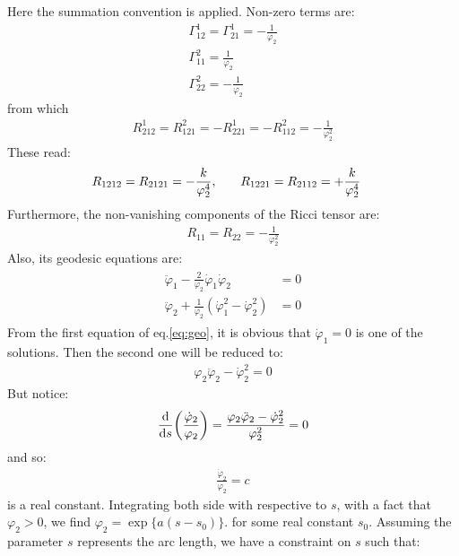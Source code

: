 Here the summation convention is applied. Non-zero terms are:
\begin{align}
    \label{eq:2.53}
    \Gamma _{12} ^{1} = \Gamma _{21}^{1} = -\frac{1}{\varphi _{2}} \\
    \label{eq:2.54}
    \Gamma _{11} ^{2} = \frac{1}{\varphi _{2}}\\
    \label{eq:2.55}
    \Gamma _{22}^{2} = -\frac{1}{\varphi _{2}}
\end{align}
from which
\begin{align}
    R_{212}^{1} = R_{121}^{2} = -R_{221}^{1} = -R_{112}^{2} = -\frac{1}{\varphi_{2} ^{2}}
\end{align}
These read:
\begin{align}
    R_{1212} = R_{2121} = -\frac{k}{\varphi_{2} ^{4}} ,& \qq{} R_{1221} = R_{2112} = +\frac{k}{\varphi_{2} ^{4}}
\end{align}
Furthermore, the non-vanishing components of the Ricci tensor are:
\begin{align}
    R_{11} = R_{22} = -\frac{1}{\varphi_{2}^{2}}
\end{align}
Also, its geodesic equations are:
\begin{align}[left=\empheqlbrace]
    \label{eq:geo}
    \begin{split}
        \ddot \varphi_{1} - \frac{2}{\varphi_{2}} \dot \varphi_{1} \dot \varphi_{2} &= 0 \\
        \ddot \varphi_{2} +\frac{1}{\varphi_{2}} (\dot \varphi_{1} ^{2} - \dot \varphi_{2}^{2}) &=0
    \end{split}
\end{align}
From the first equation of eq.\ref{eq:geo}, it is obvious that $\dot \varphi _{1} = 0$ is one of the solutions. Then the second one will be reduced to:
\begin{align}
    \varphi _{2} \ddot{\varphi}_{2} - \dot \varphi _{2} ^{2} = 0
\end{align}
But notice:
\begin{align}
    \dv{s}(\frac{\dot \varphi_{2}}{\varphi_{2}}) = \frac{\varphi _{2} \ddot{\varphi}_{2} - \dot \varphi _{2} ^{2}}{\varphi_{2}^{2}} =0
\end{align}
and so:
\begin{align}
    \frac{\dot \varphi_{2}}{\varphi_{2}} = c
\end{align}
is a real constant. Integrating both side with respective to $s$, with a fact that $\varphi_{2} >0$, we find $\varphi_{2} = \exp \lbrace a(s-s_{0}) \rbrace$. for some real constant $s_{0}$. Assuming the parameter $s$ represents the arc length, we have a constraint on $s$ such that:
